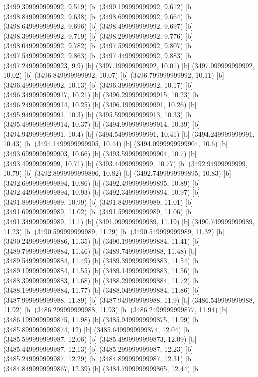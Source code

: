 {{{(3499.399999999992, 9.519) [b] 
(3499.199999999992, 9.612) [b] 
(3498.849999999992, 9.638) [b] 
(3498.699999999992, 9.664) [b] 
(3498.649999999992, 9.696) [b] 
(3498.499999999992, 9.697) [b] 
(3498.399999999992, 9.719) [b] 
(3498.299999999992, 9.776) [b] 
(3498.049999999992, 9.782) [b] 
(3497.599999999992, 9.807) [b] 
(3497.549999999992, 9.863) [b] 
(3497.449999999992, 9.883) [b] 
(3497.2499999999923, 9.9) [b] 
(3497.199999999992, 10.01) [b] 
(3497.099999999992, 10.02) [b] 
(3496.849999999992, 10.07) [b] 
(3496.799999999992, 10.11) [b] 
(3496.499999999992, 10.13) [b] 
(3496.399999999992, 10.17) [b] 
(3496.3499999999917, 10.21) [b] 
(3496.2999999999915, 10.23) [b] 
(3496.2499999999914, 10.25) [b] 
(3496.199999999991, 10.26) [b] 
(3495.949999999991, 10.3) [b] 
(3495.5999999999913, 10.33) [b] 
(3495.4999999999914, 10.37) [b] 
(3494.9999999999914, 10.39) [b] 
(3494.949999999991, 10.4) [b] 
(3494.549999999991, 10.41) [b] 
(3494.249999999991, 10.43) [b] 
(3494.1499999999905, 10.44) [b] 
(3494.0999999999904, 10.6) [b] 
(3493.6999999999903, 10.66) [b] 
(3493.5999999999904, 10.7) [b] 
(3493.49999999999, 10.71) [b] 
(3493.44999999999, 10.77) [b] 
(3492.94999999999, 10.79) [b] 
(3492.8999999999896, 10.82) [b] 
(3492.7499999999895, 10.83) [b] 
(3492.6999999999894, 10.86) [b] 
(3492.4999999999895, 10.89) [b] 
(3492.4499999999894, 10.93) [b] 
(3492.3499999999894, 10.97) [b] 
(3491.899999999989, 10.99) [b] 
(3491.849999999989, 11.01) [b] 
(3491.699999999989, 11.02) [b] 
(3491.599999999989, 11.06) [b] 
(3491.349999999989, 11.1) [b] 
(3491.099999999989, 11.19) [b] 
(3490.749999999989, 11.23) [b] 
(3490.599999999989, 11.29) [b] 
(3490.549999999989, 11.32) [b] 
(3490.2499999999886, 11.35) [b] 
(3490.1999999999884, 11.41) [b] 
(3489.7999999999884, 11.46) [b] 
(3489.749999999988, 11.48) [b] 
(3489.5499999999884, 11.49) [b] 
(3489.3999999999883, 11.54) [b] 
(3489.1999999999884, 11.55) [b] 
(3489.1499999999883, 11.56) [b] 
(3488.3999999999883, 11.68) [b] 
(3488.2999999999884, 11.72) [b] 
(3488.1999999999884, 11.77) [b] 
(3488.0499999999884, 11.86) [b] 
(3487.999999999988, 11.89) [b] 
(3487.949999999988, 11.9) [b] 
(3486.549999999988, 11.92) [b] 
(3486.299999999988, 11.93) [b] 
(3486.2499999999877, 11.94) [b] 
(3486.1999999999875, 11.98) [b] 
(3485.9499999999875, 11.99) [b] 
(3485.8999999999874, 12) [b] 
(3485.6499999999874, 12.04) [b] 
(3485.599999999987, 12.06) [b] 
(3485.4999999999873, 12.09) [b] 
(3485.449999999987, 12.13) [b] 
(3485.299999999987, 12.23) [b] 
(3485.249999999987, 12.29) [b] 
(3484.899999999987, 12.31) [b] 
(3484.8499999999867, 12.39) [b] 
(3484.7999999999865, 12.44) [b] 
}}}
